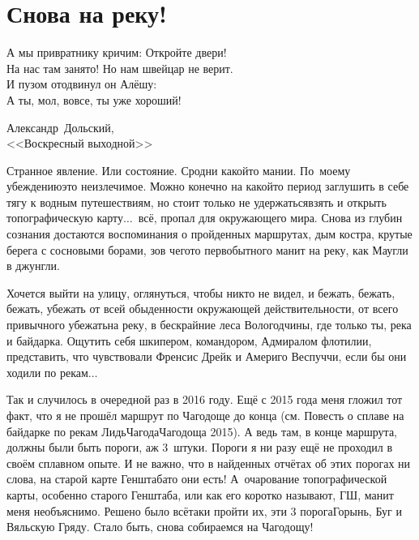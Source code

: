 \chapter{Снова на реку!} 

\setlength{\epigraphwidth}{0.75\textwidth}

\epigraph{%
	А мы привратнику кричим: Откройте двери! \\
	На нас там занято! Но нам швейцар не верит. \\
	И пузом отодвинул он Алёшу: \\
	А ты, мол, вовсе, ты уже хороший!}
	{
	\begin{flushright}
		\small{Александр~Дольский,\\<<Воскресный выходной>>}
	\end{flushright}
	}

Странное явление. Или состояние. Сродни какой\sdash то мании. По~моему убеждению\mdash это неизлечимое. Можно конечно на какой\sdash то период заглушить в себе тягу к водным путешествиям, но стоит только не удержаться\mdash взять и открыть топографическую карту$\ldots$~всё, пропал для окружающего мира. Снова из глубин сознания достаются воспоминания о пройденных маршрутах, дым костра, крутые берега с сосновыми борами, зов чего\sdash то первобытного манит на реку, как Маугли в джунгли. 

Хочется выйти на улицу, оглянуться, чтобы никто не видел, и бежать, бежать, бежать, убежать от всей обыденности окружающей действительности, от всего привычного убежать\mdash на реку, в бескрайние леса Вологодчины, где только ты, река и байдарка. Ощутить себя шкипером, командором, Адмиралом флотилии, представить, что чувствовали Френсис Дрейк и Америго Веспуччи, если бы они ходили по рекам$\ldots$ 

Так и случилось в очередной раз в 2016 году. Ещё с 2015 года меня гложил тот факт, что я не прошёл маршрут по Чагодоще до конца (см. Повесть о сплаве на байдарке по рекам Лидь\sdash Чагода\sdash Чагодоща 2015). А ведь там, в конце маршрута, должны были быть пороги, аж 3~штуки. Пороги я ни разу ещё не проходил в своём сплавном опыте. И не важно, что в найденных отчётах об этих порогах ни слова, на старой карте Генштаба\sdash то они есть! А~очарование топографической карты, особенно старого Генштаба, или как его коротко называют, ГШ, манит меня необъяснимо. Решено было всё\sdash таки пройти их, эти 3 порога\mdash Горынь, Буг и Вяльскую Гряду. Стало быть, снова собираемся на Чагодощу!

